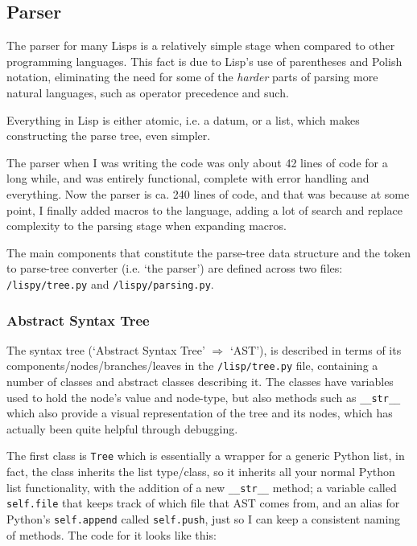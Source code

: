 \documentclass{article}
\newcommand{\code}[1]{\texttt{#1}}
\begin{document}
  \subsection{Parser}
    The parser for many Lisps is a relatively simple stage when compared to other
    programming languages.  This fact is due to Lisp's use of parentheses and
    Polish notation, eliminating the need for some of the \emph{harder} parts
    of parsing more natural languages, such as operator precedence and such.

    Everything in Lisp is either atomic, i.e. a datum, or a list, which makes
    constructing the parse tree, even simpler.

    The parser when I was writing the code was only about 42 lines of code
    for a long while, and was entirely functional, complete with error handling
    and everything. Now the parser is ca. 240 lines of code, and that was
    because at some point, I finally added macros to the language, adding a lot
    of search and replace complexity to the parsing stage when expanding macros.

    The main components that constitute the parse-tree data structure and
    the token to parse-tree converter (i.e. `the parser') are defined across two
    files: \code{/lispy/tree.py} and \code{/lispy/parsing.py}.

    \clearpage

    \subsubsection{Abstract Syntax Tree}
      The syntax tree (`Abstract Syntax Tree' $\Rightarrow$ `AST'), is described
      in terms of its components/nodes/branches/leaves in the \code{/lisp/tree.py}
      file, containing a number of classes and abstract classes describing it.
      The classes have variables used to hold the node's value and node-type,
      but also methods such as \code{\_\_str\_\_} which also provide a visual
      representation of the tree and its nodes, which has actually been quite
      helpful through debugging.

      The first class is \code{Tree} which is essentially a wrapper for a generic
      Python list, in fact, the class inherits the list type/class, so it inherits
      all your normal Python list functionality, with the addition of a new
      \code{\_\_str\_\_} method; a variable called \code{self.file} that keeps
      track of which file that AST comes from, and an alias for Python's
      \code{self.append} called \code{self.push}, just so I can keep a consistent
      naming of methods. The code for it looks like this:
\end{document}

